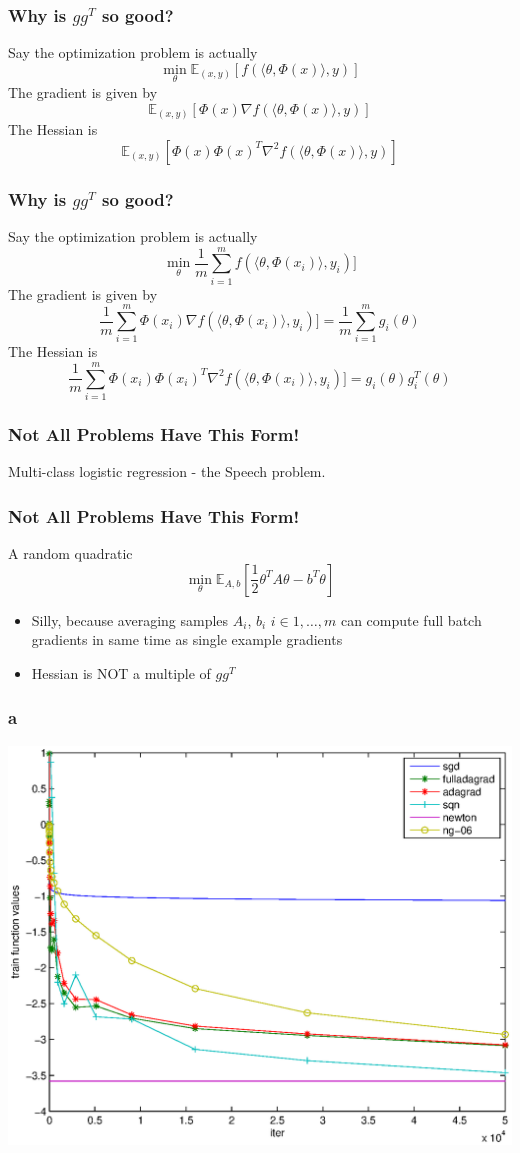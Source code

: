 \documentclass{beamer}
\begin{document}
\begin{frame}
	\frametitle{Why is $gg^T$ so good?}
	Say the optimization problem is actually
		\[
			\min_{\theta} \mathbb{E}_{(x,y)}[ f(\langle \theta, \Phi(x) \rangle,y)]
		\]
		The gradient is given by 
		\[
			 \mathbb{E}_{(x,y)}[  \Phi(x) \nabla f(\langle \theta, \Phi(x) \rangle,y)]
		\]
		The Hessian is
		\[
			 \mathbb{E}_{(x,y)}[  \Phi(x) \Phi(x)^T \nabla^2 f(\langle \theta, \Phi(x) \rangle,y)]
		\]
\end{frame}

\begin{frame}
	\frametitle{Why is $gg^T$ so good?}
	Say the optimization problem is actually
		\[
			\min_{\theta} \frac{1}{m} \sum_{i=1}^{m} f(\langle \theta, \Phi(x_i) \rangle,y_i)]
		\]
		The gradient is given by 
		\[
			  \frac{1}{m} \sum_{i=1}^{m} \Phi(x_i)  \nabla f(\langle \theta, \Phi(x_i) \rangle,y_i)] = \frac{1}{m} \sum_{i=1}^{m} g_i(\theta)  
		\]
		The Hessian is 
		\[
			  \frac{1}{m} \sum_{i=1}^{m} \Phi(x_i)  \Phi(x_i)^T  \nabla^2 f(\langle \theta, \Phi(x_i) \rangle,y_i)] =g_i(\theta)g_i^T(\theta)  
		\]
\end{frame}

\begin{frame}
	\frametitle{Not All Problems Have This Form!}
	   Multi-class logistic regression - the Speech problem.
\end{frame}

\begin{frame}
	\frametitle{Not All Problems Have This Form!}
	   A random quadratic
	   \[
	   		\min_{\theta}\mathbb{E}_{A,b}[\frac{1}{2}\theta^T A \theta - b^T \theta]
	   \]
	   \begin{itemize}
	   	\item Silly, because averaging samples $A_i$, $b_i$ $i \in {1,\ldots,m}$ can compute full batch gradients in same time as single example gradients
	   	\item Hessian is NOT a multiple of $g g^T$ 
	   \end{itemize}
\end{frame}


							 \begin{frame}
							 	\frametitle{a}
							 				\includegraphics[scale=1]{figures/q.eps}
							 \end{frame} 
							 
\end{document}
